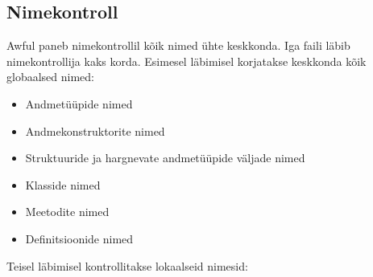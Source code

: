 \documentclass[12pt]{article}
\begin{document}
    \subsection{Nimekontroll}
      Awful paneb nimekontrollil kõik nimed ühte keskkonda. Iga faili läbib nimekontrollija kaks korda. Esimesel läbimisel korjatakse keskkonda kõik globaalsed nimed:

      \begin{itemize}
        \item
          Andmetüüpide nimed
        \item
          Andmekonstruktorite nimed
        \item
          Struktuuride ja hargnevate andmetüüpide väljade nimed
        \item
          Klasside nimed
        \item
          Meetodite nimed
        \item
          Definitsioonide nimed
      \end{itemize}

      Teisel läbimisel kontrollitakse lokaalseid nimesid:
\end{document}
